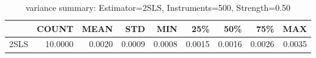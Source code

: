 \begin{table}[ht]
\centering
\caption{variance summary: Estimator=2SLS, Instruments=500, Strength=0.50}
\begin{tabular}{lrrrrrrrr}
\toprule
 & COUNT & MEAN & STD & MIN & 25\% & 50\% & 75\% & MAX \\
\midrule
2SLS & 10.0000 & 0.0020 & 0.0009 & 0.0008 & 0.0015 & 0.0016 & 0.0026 & 0.0035 \\
\bottomrule
\end{tabular}
\end{table}
